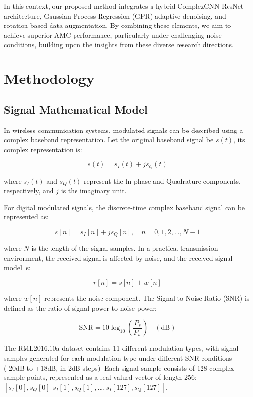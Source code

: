 \documentclass[conference]{IEEEtran}
\begin{document}
In this context, our proposed method integrates a hybrid ComplexCNN-ResNet architecture, Gaussian Process Regression (GPR) adaptive denoising, and rotation-based data augmentation. By combining these elements, we aim to achieve superior AMC performance, particularly under challenging noise conditions, building upon the insights from these diverse research directions.

\section{Methodology}

\subsection{Signal Mathematical Model}

In wireless communication systems, modulated signals can be described using a complex baseband representation. Let the original baseband signal be $s(t)$, its complex representation is:

\begin{equation}
s(t) = s_I(t) + js_Q(t)
\end{equation}

where $s_I(t)$ and $s_Q(t)$ represent the In-phase and Quadrature components, respectively, and $j$ is the imaginary unit.

For digital modulated signals, the discrete-time complex baseband signal can be represented as:

\begin{equation}
s[n] = s_I[n] + js_Q[n], \quad n = 0, 1, 2, ..., N-1
\end{equation}

where $N$ is the length of the signal samples. In a practical transmission environment, the received signal is affected by noise, and the received signal model is:

\begin{equation}
r[n] = s[n] + w[n]
\end{equation}

where $w[n]$ represents the noise component. The Signal-to-Noise Ratio (SNR) is defined as the ratio of signal power to noise power:

\begin{equation}
\mathrm{SNR} = 10\log_{10}\left(\frac{P_s}{P_w}\right) \quad(\mathrm{dB})
\end{equation}

The RML2016.10a dataset contains 11 different modulation types, with signal samples generated for each modulation type under different SNR conditions (-20dB to +18dB, in 2dB steps). Each signal sample consists of 128 complex sample points, represented as a real-valued vector of length 256: $[s_I[0], s_Q[0], s_I[1], s_Q[1], ..., s_I[127], s_Q[127]]$.
\end{document}
